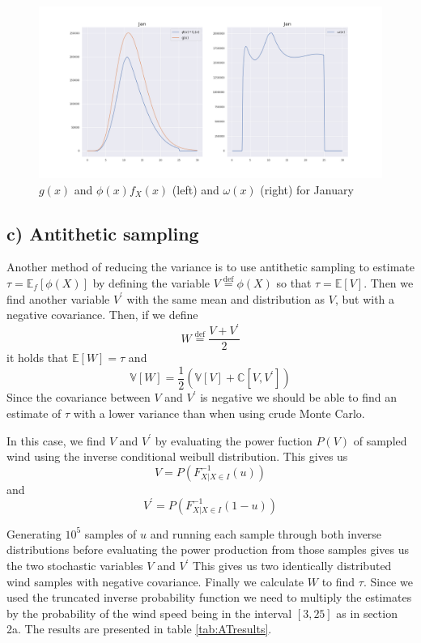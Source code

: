 \documentclass[a4paper]{article}
\begin{document}
\begin{figure}[H]
    \centering
    \includegraphics[width = 1.0\textwidth]{images/janISMC}
    \caption{$g(x)$ and $\phi(x)f_X(x)$ (left) and $\omega(x)$ (right) for January}
    \label{fig:ISMCjan}
\end{figure}

\subsection*{c) Antithetic sampling}
Another method of reducing the variance is to use antithetic sampling to estimate $\tau = \mathbb{E}_f[\phi (X)]$ by defining the variable $V \overset{\mathrm{def}}{=} \phi (X)$ so that $\tau = \mathbb{E}[V]$. Then we find another variable $V^\prime$ with the same mean and distribution as $V$, but with a negative covariance. Then, if we define $$W \overset{\mathrm{def}}{=} \frac{V + V^\prime}{2}$$ it holds that $\mathbb{E}[W] = \tau$ and $$\mathbb{V}[W] = \frac{1}{2}(\mathbb{V}[V] + \mathbb{C}[V, V^\prime])$$Since the covariance between $V$ and $V^\prime$ is negative we should be able to find an estimate of $\tau$ with a lower variance than when using crude Monte Carlo.

In this case, we find $V$ and $V^\prime$ by evaluating the power fuction $P(V)$ of sampled wind using the inverse conditional weibull distribution. This gives us
\begin{equation}
    V = P(F_{X|X\in I}^{-1}(u))
\end{equation}
and
\begin{equation}
    V^\prime = P(F_{X|X\in I}^{-1}(1-u))
\end{equation}

Generating $10^5$ samples of $u$ and running each sample through both inverse distributions before evaluating the power production from those samples gives us the two stochastic variables $V$ and $V^\prime$ This gives us two identically distributed wind samples with negative covariance. Finally we calculate $W$ to find $\tau$. Since we used the truncated inverse probability function we need to multiply the estimates by the probability of the wind speed being in the interval $[3,25]$ as in section 2a. The results are presented in table \ref{tab:ATresults}.
\end{document}
